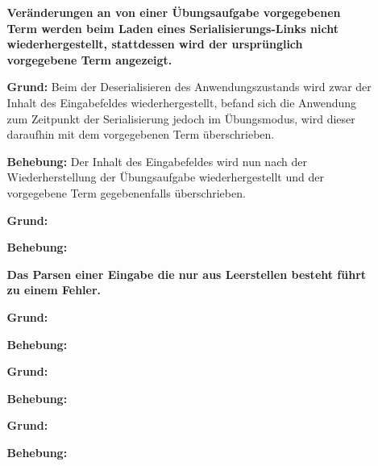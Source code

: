 \documentclass[parskip=full,11pt,openany]{scrreprt}
\begin{document}
\begin{itemize}[itemsep=3ex]
\item[] %
\begin{itemize}[noitemsep]
\item[] {\bfseries Veränderungen an von einer Übungsaufgabe vorgegebenen Term  werden beim Laden eines Serialisierungs-Links nicht wiederhergestellt, stattdessen wird der ursprünglich vorgegebene Term angezeigt. }
\item [\textbf{Grund:}] Beim der Deserialisieren des Anwendungszustands wird zwar der Inhalt des Eingabefeldes wiederhergestellt, befand sich die Anwendung zum Zeitpunkt der Serialisierung jedoch im Übungsmodus, wird dieser daraufhin mit dem vorgegebenen Term überschrieben. 
\item [\textbf{Behebung:}] Der Inhalt des Eingabefeldes wird nun nach der Wiederherstellung der Übungsaufgabe wiederhergestellt und der vorgegebene Term gegebenenfalls überschrieben.
\end{itemize}

\item[] %
\begin{itemize}[noitemsep]
\item[] {\bfseries }
\item [\textbf{Grund:}]
\item [\textbf{Behebung:}]
\end{itemize}

\item[] %
\begin{itemize}[noitemsep]
\item[] {\bfseries Das Parsen einer Eingabe die nur aus Leerstellen besteht führt zu einem Fehler.}
\item [\textbf{Grund:}]
\item [\textbf{Behebung:}]
\end{itemize}

\item[] %
\begin{itemize}[noitemsep]
\item[] {\bfseries }
\item [\textbf{Grund:}]
\item [\textbf{Behebung:}]
\end{itemize}

\item[] %
\begin{itemize}[noitemsep]
\item[] {\bfseries  }
\item [\textbf{Grund:}]
\item [\textbf{Behebung:}]
\end{itemize}


\end{itemize}
\end{document}
